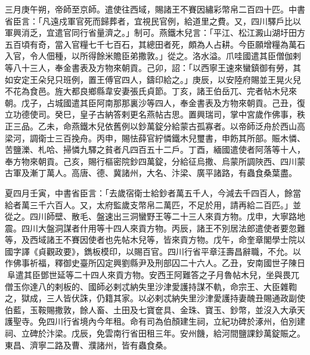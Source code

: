 \begin{pinyinscope}
 三月庚午朔，帝師至京師。遣使往西域，賜諸王不賽因繡彩幣帛二百四十匹。中書省臣言：「凡遠戍軍官死而歸葬者，宜視民官例，給道里之費。又，四川驛戶比以軍興消乏，宜遣官同行省量濟之。」制可。燕鐵木兒言：「平江、松江澱山湖圩田方五百頃有奇，當入官糧七千七百石，其總田者死，頗為人占耕。今臣願增糧為萬石入官，令人佃種，以所得餘米贍臣弟撒敦。」從之。洛水溢。爪哇國遣其臣僧伽剌等八十三人，奉金書表及方物來朝貢。己卯，詔：「以西寧王速來蠻鎮御有勞，其如安定王朵兒只班例，置王傅官四人，鑄印給之。」庚辰，以安陸府賜並王晃火兒不花為食邑。旌大都良鄉縣韋安妻張氏貞節。丁亥，諸王伯岳兀、完者帖木兒來朝。戊子，占城國遣其臣阿南那那裏沙等四人，奉金書表及方物來朝貢。己丑，復立功德使司。癸巳，皇子古納答剌更名燕帖古思。置興瑞司，掌中宮歲作佛事，秩正三品。乙未，命燕鐵木兒依舊例以鈔萬錠分給蒙古孤寡者。以帝師泛舟於西山高梁河，調衛士三百挽舟。丙申，賜怯薛官紵憐鐵木兒璽書，申飭其所部。賑木憐、苦鹽濼、札哈、掃憐九驛之貧者凡四百五十二戶。丁酉，緬國遣使者阿落等十人，奉方物來朝貢。己亥，賜行樞密院鈔四萬錠，分給征烏撒、烏蒙所調陜西、四川蒙古軍及漸丁萬人。高唐、德、冀諸州，大名、汴梁、廣平諸路，有蟲食桑葉盡。



 夏四月壬寅，中書省臣言：「去歲宿衛士給鈔者萬五千人，今減去千四百人，餘當給者萬三千六百人。又，太府監歲支幣帛二萬匹，不足於用，請再給二百匹。」並從之。四川師壁、散毛、盤速出三洞蠻野王等二十三人來貢方物。戊申，大寧路地震。四川大盤洞謀者什用等十四人來貢方物。丙辰，諸王不別居法郎遣使者要忽難等，及西域諸王不賽因使者也先帖木兒等，皆來貢方物。戊午，命奎章閣學士院以國字譯《貞觀政要》，鐫板模印，以賜百官。四川行省平章汪壽昌辭職，不允。以作佛事祈福，釋御史臺所囚定興劉縣尹及刑部囚二十六人。乙丑，安南國世子陳日阜遣其臣鄧世延等二十四人來貢方物。安西王阿難答之子月魯帖木兒，坐與畏兀僧玉你達八的剌板的、國師必剌忒納失里沙津愛護持謀不軌，命宗王、大臣雜鞫之，獄成，三人皆伏誅，仍籍其家。以必剌忒納失里沙津愛護持妻醜丑賜通政副使伯藍，玉鞍賜撒敦，餘人畜、土田及七寶奩具、金珠、寶玉、鈔幣，並沒入大承天護聖寺。免四川行省境內今年租。命有司為伯顏建生祠，立紀功碑於涿州，伯別建祠、立碑於汴梁。戊辰，免雲南行省田租三年。安州饑，給河間鹽課鈔萬錠賑之。東昌、濟寧二路及曹、濮諸州，皆有蟲食桑。




\end{pinyinscope}
